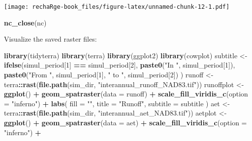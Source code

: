 \documentclass[
]{book}
\newenvironment{Shaded}{\begin{snugshade}}{\end{snugshade}}
\newcommand{\AttributeTok}[1]{\textcolor[rgb]{0.13,0.29,0.53}{#1}}
\newcommand{\DecValTok}[1]{\textcolor[rgb]{0.00,0.00,0.81}{#1}}
\newcommand{\FunctionTok}[1]{\textcolor[rgb]{0.13,0.29,0.53}{\textbf{#1}}}
\newcommand{\NormalTok}[1]{#1}
\newcommand{\OtherTok}[1]{\textcolor[rgb]{0.56,0.35,0.01}{#1}}
\newcommand{\SpecialCharTok}[1]{\textcolor[rgb]{0.81,0.36,0.00}{\textbf{#1}}}
\newcommand{\StringTok}[1]{\textcolor[rgb]{0.31,0.60,0.02}{#1}}
\begin{document}
\texttt{[image: rechaRge-book\_files/figure-latex/unnamed-chunk-12-1.pdf]}

\begin{Shaded}
\begin{Highlighting}[]
\FunctionTok{nc\_close}\NormalTok{(nc)}
\end{Highlighting}
\end{Shaded}

Visualize the saved raster files:

\begin{Shaded}
\begin{Highlighting}[]
\FunctionTok{library}\NormalTok{(tidyterra)}
\FunctionTok{library}\NormalTok{(terra)}
\FunctionTok{library}\NormalTok{(ggplot2)}
\FunctionTok{library}\NormalTok{(cowplot)}
\NormalTok{subtitle }\OtherTok{\textless{}{-}} \FunctionTok{ifelse}\NormalTok{(simul\_period[}\DecValTok{1}\NormalTok{] }\SpecialCharTok{==}\NormalTok{ simul\_period[}\DecValTok{2}\NormalTok{],}
  \FunctionTok{paste0}\NormalTok{(}\StringTok{"In "}\NormalTok{, simul\_period[}\DecValTok{1}\NormalTok{]),}
  \FunctionTok{paste0}\NormalTok{(}\StringTok{"From "}\NormalTok{, simul\_period[}\DecValTok{1}\NormalTok{], }\StringTok{" to "}\NormalTok{, simul\_period[}\DecValTok{2}\NormalTok{])}
\NormalTok{)}
\NormalTok{runoff }\OtherTok{\textless{}{-}}\NormalTok{ terra}\SpecialCharTok{::}\FunctionTok{rast}\NormalTok{(}\FunctionTok{file.path}\NormalTok{(sim\_dir, }\StringTok{"interannual\_runoff\_NAD83.tif"}\NormalTok{))}
\NormalTok{runoffplot }\OtherTok{\textless{}{-}} \FunctionTok{ggplot}\NormalTok{() }\SpecialCharTok{+}
  \FunctionTok{geom\_spatraster}\NormalTok{(}\AttributeTok{data =}\NormalTok{ runoff) }\SpecialCharTok{+}
  \FunctionTok{scale\_fill\_viridis\_c}\NormalTok{(}\AttributeTok{option =} \StringTok{"inferno"}\NormalTok{) }\SpecialCharTok{+}
  \FunctionTok{labs}\NormalTok{(}
    \AttributeTok{fill =} \StringTok{""}\NormalTok{,}
    \AttributeTok{title =} \StringTok{"Runoff"}\NormalTok{,}
    \AttributeTok{subtitle =}\NormalTok{ subtitle}
\NormalTok{  )}
\NormalTok{aet }\OtherTok{\textless{}{-}}\NormalTok{ terra}\SpecialCharTok{::}\FunctionTok{rast}\NormalTok{(}\FunctionTok{file.path}\NormalTok{(sim\_dir, }\StringTok{"interannual\_aet\_NAD83.tif"}\NormalTok{))}
\NormalTok{aetplot }\OtherTok{\textless{}{-}} \FunctionTok{ggplot}\NormalTok{() }\SpecialCharTok{+}
  \FunctionTok{geom\_spatraster}\NormalTok{(}\AttributeTok{data =}\NormalTok{ aet) }\SpecialCharTok{+}
  \FunctionTok{scale\_fill\_viridis\_c}\NormalTok{(}\AttributeTok{option =} \StringTok{"inferno"}\NormalTok{) }\SpecialCharTok{+}

\end{Highlighting}
\end{Shaded}
\end{document}
